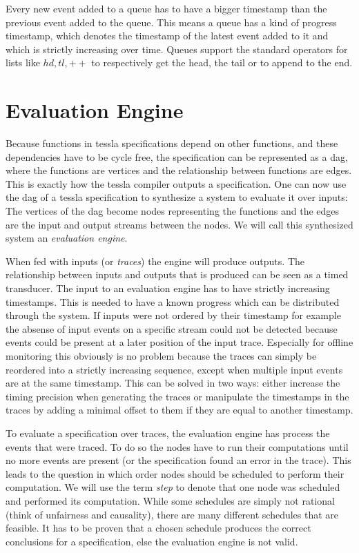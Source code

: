 Every new event added to a queue has to have a bigger timestamp than the previous event added to the queue.
This means a queue has a kind of progress timestamp, which denotes the timestamp of the latest event added to it and which is strictly increasing over time.
Queues support the standard operators for lists like \(\mathit{hd}, \mathit{tl}, ++\) to respectively get the head, the tail or to append to the end.


\section{ Evaluation Engine}
\label{sec:definitions:eval_engine}

Because functions in \gls{tessla} specifications depend on other functions, and these dependencies have to be cycle free, the specification can be represented as a \gls{dag}, where the functions are vertices and the relationship between functions are edges.
This is exactly how the \gls{tessla} compiler outputs a specification.
One can now use the \gls{dag} of a \gls{tessla} specification to synthesize a system to evaluate it over inputs:
The vertices of the \gls{dag} become nodes representing the functions and the edges are the input and output streams between the nodes.
We will call this synthesized system an \emph{evaluation engine}.

When fed with inputs (or \emph{traces}) the engine will produce outputs.
The relationship between inputs and outputs that is produced can be seen as a timed transducer.
The input to an evaluation engine has to have strictly increasing timestamps.
This is needed to have a known progress which can be distributed through the system.
If inputs were not ordered by their timestamp for example the absense of input events on a specific stream could not be detected because events could be present at a later position of the input trace.
Especially for offline monitoring this obviously is no problem because the traces can simply be reordered into a strictly increasing sequence, except when multiple input events are at the same timestamp.
This can be solved in two ways: either increase the timing precision when generating the traces or manipulate the timestamps in the traces by adding a minimal offset to them if they are equal to another timestamp.

To evaluate a specification over traces, the evaluation engine has process the events that were traced.
To do so the nodes have to run their computations until no more events are present (or the specification found an error in the trace).
This leads to the question in which order nodes should be scheduled to perform their computation.
We will use the term \emph{step} to denote that one node was scheduled and performed its computation.
While some schedules are simply not rational (think of unfairness and causality), there are many different schedules that are feasible.
It has to be proven that a chosen schedule produces the correct conclusions for a specification, else the evaluation engine is not valid.

